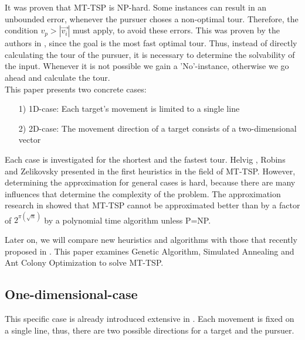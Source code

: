 \documentclass[english,version-2019-07]{uzl-thesis}
\begin{document}
It was proven that MT-TSP is NP-hard. Some instances can result in an unbounded error, whenever the pursuer choses a non-optimal tour. Therefore, the condition $v_p > |\overrightarrow{v_i}|$ must apply, to avoid these errors. This was proven by the authors in \cite{helvig}, since the goal is the most fast optimal tour.  Thus, instead of directly calculating the tour of the pursuer, it is necessary to determine the solvability of the input. Whenever it is not possible we gain a 'No'-instance, otherwise we go ahead and calculate the tour. \\
This paper presents two concrete cases:
\begin{itemize}
\item[1)]
1D-case: 
Each target's movement is limited to a single line 

\item[2)]
2D-case:
The movement direction of a target consists of a two-dimensional vector 

\end{itemize}

Each case is investigated for the shortest and the fastest tour. Helvig , Robins and Zelikovsky presented in \cite{helvig} the first heuristics in the field of MT-TSP. However, determining the approximation for general cases is hard, because there are many influences that determine the complexity of the problem. The approximation research in \cite{hammar} showed that MT-TSP cannot be approximated better than by a factor of $2^{\pi (\sqrt{n})}$ by a polynomial time algorithm unless P=NP.

Later on, we will compare new heuristics and algorithms with those that recently proposed in \cite{moraes}. This paper examines Genetic Algorithm, Simulated Annealing and Ant Colony Optimization to solve MT-TSP.


\subsection{One-dimensional-case}

This specific case is already introduced extensive in \cite{helvig}. Each movement is fixed on a single line, thus, there are two possible directions for a target and the pursuer. 


\end{document}
